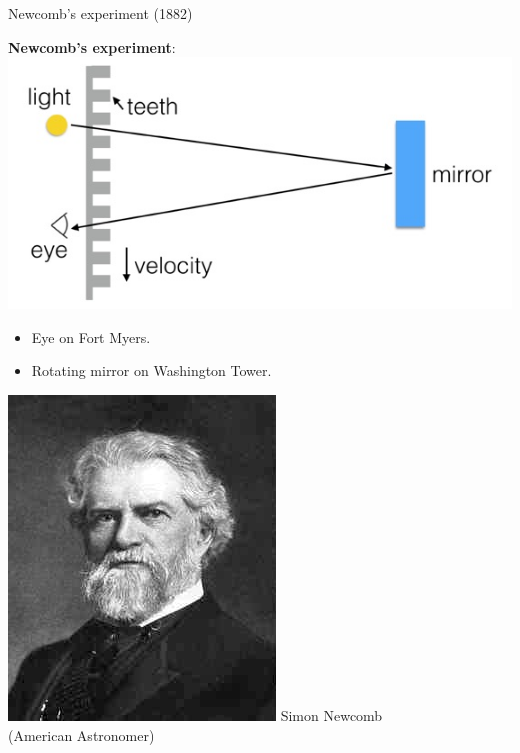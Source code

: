 \documentclass[10pt,xcolor=svgnames]{beamer} %
\begin{document}
\begin{frame}{Newcomb's experiment (1882)}
    \begin{minipage}{0.6\linewidth}
        \textbf{Newcomb's experiment}:\\
        \includegraphics[width = \textwidth]{images/measure-2-reflect.jpg}
    \begin{itemize}
        \item Eye on Fort Myers.
        \item Rotating mirror on Washington Tower.
    \end{itemize}
    \end{minipage}
    \hfill
    \begin{minipage}{0.35\linewidth}
        \includegraphics[width = \textwidth]{images/Newcomb.jpeg} 
        Simon Newcomb \\
        (American Astronomer)
    \end{minipage}
\end{frame}
\end{document}

